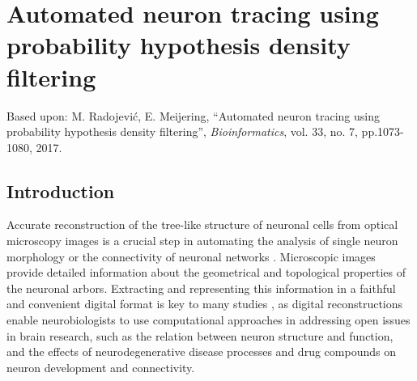 %
%
\chpos{15mm}{8mm}
\chapter[Automated neuron tracing using probability hypothesis density filtering]{Automated neuron tracing using probability hypothesis density filtering}
\label{ch3:phd}

\vspace*{23em}
\begin{publish}
	Based upon: M. Radojevi\'{c}, E. Meijering, ``Automated neuron tracing using probability hypothesis density filtering'', \textit{Bioinformatics}, vol. 33, no. 7, pp.1073-1080, 2017.   
\end{publish}

\section{Introduction}
\label{sec:introduction}
Accurate reconstruction of the tree-like structure of neuronal cells from optical microscopy images is a crucial step in automating the analysis of single neuron morphology or the connectivity of neuronal networks \cite{meijering2010neuron, donohue2011automated, peng2015bigneuron}. Microscopic images provide detailed information about the geometrical and topological properties of the neuronal arbors. Extracting and representing this information in a faithful and convenient digital format is key to many studies \cite{ascoli2002computational, ascoli2007neuromorpho, svoboda2011past, senft2011brief, halavi2012digital, lu2015quantitative}, as digital reconstructions enable neurobiologists to use computational approaches in addressing open issues in brain research, such as the relation between neuron structure and function, and the effects of neurodegenerative disease processes and drug compounds on neuron development and connectivity.

